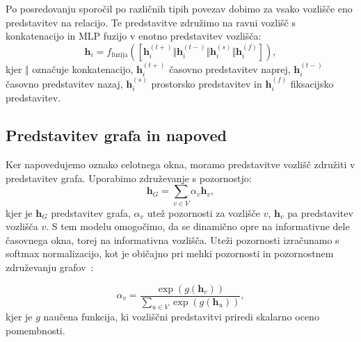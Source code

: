 Po posredovanju sporočil po različnih tipih povezav dobimo za vsako vozlišče eno predstavitev na relacijo.
Te predstavitve združimo na ravni vozlišč s konkatenacijo in MLP fuzijo v enotno predstavitev vozlišča:
\begin{equation}
    \mathbf{h}_i =
    f_{\text{fuzija}}
    \left(
    \left[
    \mathbf{h}_{i}^{(t+)}
    \Vert
    \mathbf{h}_{i}^{(t-)}
    \Vert
    \mathbf{h}_{i}^{(s)}
    \Vert
    \mathbf{h}_{i}^{(f)}
    \right]
    \right),
\end{equation}
kjer $\Vert$ označuje konkatenacijo, $\mathbf{h}_{i}^{(t+)}$ časovno predstavitev naprej, $\mathbf{h}_{i}^{(t-)}$ časovno predstavitev nazaj, $\mathbf{h}_{i}^{(s)}$ prostorsko predstavitev in $\mathbf{h}_{i}^{(f)}$ fiksacijsko predstavitev.

\subsection{Predstavitev grafa in napoved}
\label{subsec:pooling}


Ker napovedujemo oznako celotnega okna, moramo predstavitve vozlišč združiti v predstavitev grafa. Uporabimo združevanje s pozornostjo:
\begin{equation}
    \mathbf{h}_G =
    \sum_{v \in V}
    \alpha_v \mathbf{h}_v, 
\end{equation}
kjer je $\mathbf{h}_G$ predstavitev grafa, $\alpha_v$ utež pozornosti za vozlišče $v$, $\mathbf{h}_v$ pa predstavitev vozlišča $v$.
S tem modelu omogočimo, da se dinamično opre na informativne dele časovnega okna, torej na informativna vozlišča. 
Uteži pozornosti izračunamo s softmax normalizacijo, kot je običajno pri mehki pozornosti in pozornostnem združevanju grafov~\cite{bahdanau2015neural,li2016gated}:

\begin{equation}
    \alpha_v =
    \frac{\exp(g(\mathbf{h}_v))}
    {\sum_{u \in V} \exp(g(\mathbf{h}_u))},
\end{equation}
kjer je $g$ naučena funkcija, ki vozliščni predstavitvi priredi skalarno oceno pomembnosti. 

